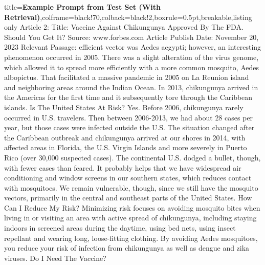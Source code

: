 \documentclass{article} %
\begin{document}
\begin{tcblisting}{title={\textbf{Example Prompt from Test Set (With Retrieval)}},colframe=black!70,colback=black!2,boxrule=0.5pt,breakable,listing only}
Article 2:
Title: Vaccine Against Chikungunya Approved By The FDA. Should You Get It?
Source: www.forbes.com
Article Publish Date: November 20, 2023
Relevant Passage: efficient vector was Aedes aegypti; however, an interesting phenomenon occurred in 2005. There was a slight alteration of the virus genome, which allowed it to spread more efficiently with a more common mosquito, Aedes albopictus. That facilitated a massive pandemic in 2005 on La Reunion island and neighboring areas around the Indian Ocean. In 2013, chikungunya arrived in the Americas for the first time and it subsequently tore through the Caribbean islands. Is The United States At Risk? Yes. Before 2006, chikungunya rarely occurred in U.S. travelers. Then between 2006-2013, we had about 28 cases per year, but those cases were infected outside the U.S. The situation changed after the Caribbean outbreak and chikungunya arrived at our shores in 2014, with affected areas in Florida, the U.S. Virgin Islands and more severely in Puerto Rico (over 30,000 suspected cases). The continental U.S. dodged a bullet, though, with fewer cases than feared. It probably helps that we have widespread air conditioning and window screens in our southern states, which reduces contact with mosquitoes. We remain vulnerable, though, since we still have the mosquito vectors, primarily in the central and southeast parts of the United States. How Can I Reduce My Risk? Minimizing risk focuses on avoiding mosquito bites when living in or visiting an area with active spread of chikungunya, including staying indoors in screened areas during the daytime, using bed nets, using insect repellant and wearing long, loose-fitting clothing. By avoiding Aedes mosquitoes, you reduce your risk of infection from chikungunya as well as dengue and zika viruses. Do I Need The Vaccine?


\end{tcblisting}
\end{document}
